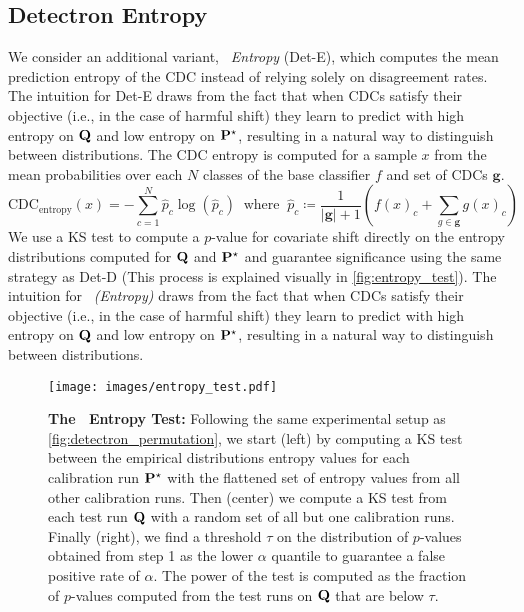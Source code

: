 \subsection{Detectron Entropy}
We consider an additional variant, \textit{\method\ Entropy} (Det-E), which computes the mean prediction entropy of the CDC instead of relying solely on disagreement rates.
The intuition for Det-E draws from the fact that when CDCs satisfy their objective (i.e., in the case of harmful shift) they
learn to predict with high entropy on $\mathbf{Q}$ and low entropy on $\mathbf{P}^\star$, resulting in a natural way to distinguish between distributions.
The CDC entropy is computed for a sample $x$ from the mean probabilities over each $N$ classes of the base classifier $f$ and set of CDCs $\mathbf{g}$.
\begin{equation}
    \text{CDC}_{\text{entropy}}(x)=-\sum_{c=1}^N {\hat{p}_c\log(\hat{p}_c)}\ \text{ where }\ \hat{p}_c \coloneqq \frac{1}{|\mathbf{g}|+1}\left(f(x)_c + \sum_{g\in \mathbf{g}} g(x)_c \right)
    \label{eq:cdc_entropy_def}
\end{equation}
We use a KS test to compute a $p$-value for covariate shift directly on the entropy distributions computed for $\mathbf{Q}$ and $\mathbf{P}^\star$ and guarantee significance using the same strategy as Det-D
(This process is explained visually in \autoref{fig:entropy_test}).
The intuition for \textit{\method\ (Entropy)} draws from the fact that when CDCs satisfy their objective (i.e., in the case of harmful shift) they
learn to predict with high entropy on $\mathbf{Q}$ and low entropy on $\mathbf{P}^\star$, resulting in a natural way to distinguish between distributions.

\begin{figure}[!htb]
    \centering
    \texttt{[image: images/entropy\_test.pdf]}
    \caption{\small \textbf{The \method\ Entropy Test:} Following the same experimental setup as \autoref{fig:detectron_permutation},
        we start (left) by computing a KS test between the empirical distributions entropy values for each calibration run $\mathbf{P}^\star$ with the flattened set of entropy values from all other calibration runs.
        Then (center) we compute a KS test from each test run $\mathbf{Q}$ with a random set of all but one calibration runs.
        Finally (right), we find a threshold $\tau$ on the distribution of $p$-values obtained from step 1 as the lower $\alpha$ quantile to guarantee a false positive rate of $\alpha$.
        The power of the test is computed as the fraction of $p$-values computed from the test runs on $\mathbf{Q}$ that are below $\tau$.}
    \label{fig:entropy_test}
\end{figure}

